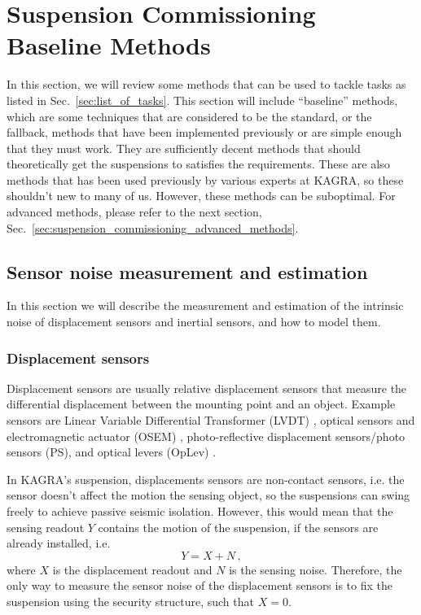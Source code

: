 \section{Suspension Commissioning Baseline Methods \label{sec:suspension_commissioning_baseline_methods}}
In this section, we will review some methods that can be used to tackle tasks as listed in Sec.~\ref{sec:list_of_tasks}.
This section will include ``baseline'' methods, which are some techniques that are considered to be the standard, or the fallback, methods that have been implemented previously or are simple enough that they must work.
They are sufficiently decent methods that should theoretically get the suspensions to satisfies the requirements.
These are also methods that has been used previously by various experts at KAGRA, so these shouldn't new to many of us.
However, these methods can be suboptimal.
For advanced methods, please refer to the next section, Sec.~\ref{sec:suspension_commissioning_advanced_methods}.

\subsection{Sensor noise measurement and estimation}
In this section we will describe the measurement and estimation of the intrinsic noise of displacement sensors and inertial sensors, and how to model them.

\subsubsection{Displacement sensors \label{displacement_sensors_baseline}}
Displacement sensors are usually relative displacement sensors that measure the differential displacement between the mounting point and an object.
Example sensors are Linear Variable Differential Transformer (LVDT) \cite{Akutsu:2021auw}, optical sensors and electromagnetic actuator (OSEM) \cite{Akutsu:2020efg, use_of_osems}, photo-reflective displacement sensors/photo sensors (PS), and optical levers (OpLev) \cite{sensing_matrices_oplev, length_sensing_oplev, optical_lever_for_kagra}.

In KAGRA's suspension, displacements sensors are non-contact sensors, i.e. the sensor doesn't affect the motion the sensing object, so the suspensions can swing freely to achieve passive seismic isolation.
However, this would mean that the sensing readout $Y$ contains the motion of the suspension, if the sensors are already installed, i.e.
\begin{equation}
	Y=X+N\,,
	\label{eqn:displacement_sensing_readout}
\end{equation}
where $X$ is the displacement readout and $N$ is the sensing noise.
Therefore, the only way to measure the sensor noise of the displacement sensors is to fix the suspension using the security structure, such that $X=0$.

